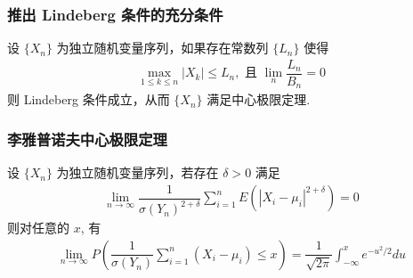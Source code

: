 \begin{frame}
	\frametitle{推出 Lindeberg 条件的充分条件}
	\begin{thm}
		设 $\{X_n\}$ 为独立随机变量序列，如果存在常数列 $\{L_n\}$ 使得
		\begin{eqnarray*}
			\max_{1\leq k\leq n}|X_k|\leq L_n, \mbox{ 且 } \lim_{n}\dfrac{L_n}{B_n}=0
		\end{eqnarray*}
		则 Lindeberg 条件成立，从而 $\{X_n\}$ 满足中心极限定理.
	\end{thm}
\end{frame}
\begin{frame}
	\frametitle{李雅普诺夫中心极限定理}
	\begin{thm} 设 $\{X_n\}$ 为独立随机变量序列，若存在 $\delta>0$ 满足
		\begin{eqnarray*}
			\lim_{n\rightarrow\infty}\dfrac{1}{\sigma(Y_n)^{2+\delta}}\sum_{i=1}^nE(|X_i-\mu_i|^{2+\delta})=0
		\end{eqnarray*}
		则对任意的 $x$, 有
		\begin{eqnarray*}
			\lim_{n\rightarrow\infty}P(\dfrac{1}{\sigma(Y_n)}\sum_{i=1}^n(X_i-\mu_i)\le x)=\dfrac{1}{\sqrt{2\pi}}\int_{-\infty}^xe^{-u^2/2}du
		\end{eqnarray*}

	\end{thm}
\end{frame}








